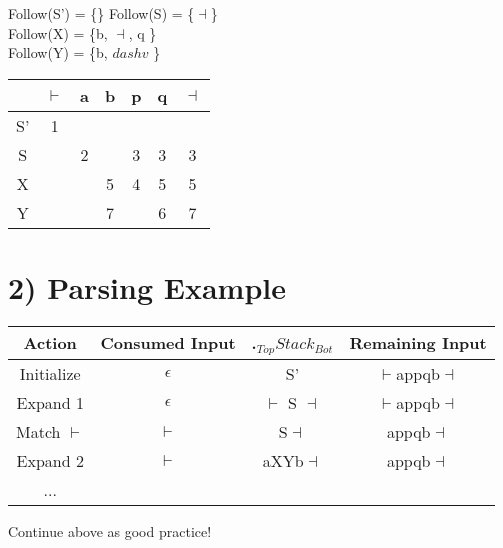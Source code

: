 \documentclass[12pt]{article}
\begin{document}
	Follow(S') = \{\}
	Follow(S) = \{$\dashv$\}\\
	Follow(X) = \{b, $\dashv$, q \}\\
	Follow(Y) = \{b, $dashv$ \}\\
	
	\begin{tabular}{c | c | c | c | c | c | c}
		& $\vdash$ & a & b & p & q & $\dashv$ \\ \hline
		S' & 1 & & & & & \\
		S & & 2 & & 3 & 3 & 3 \\
		X & & & 5 & 4 & 5 & 5\\
		Y & & & 7 & & 6 & 7 \\
	\end{tabular}
	
	\section*{2) Parsing Example}
	\begin{tabular}{c | c | c | c }
		Action & Consumed Input & .$_{Top}Stack_{Bot}$ & Remaining Input \\ \hline
		Initialize & $\epsilon$ & S' & $\vdash$appqb$\dashv$\\
		Expand 1 & $\epsilon$ & $\vdash$ S $\dashv$ & $\vdash$appqb$\dashv$\\
		Match $\vdash$ & $\vdash$ & S$\dashv$ & appqb$\dashv$\\
		Expand 2 & $\vdash$ & aXYb$\dashv$ & appqb$\dashv$\\
		...&&&\\ 
	\end{tabular}
	Continue above as good practice!
	
	
\end{document}
